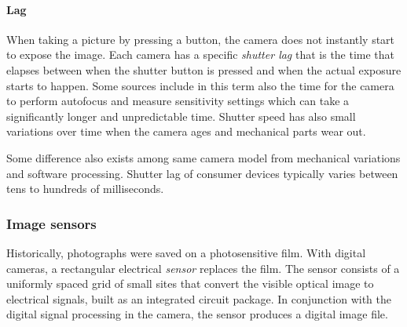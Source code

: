 

%
%


\paragraph{Lag}
When taking a picture by pressing a button, the camera does not instantly start to expose the image.
Each camera has a specific \emph{shutter lag} that is the time that elapses between when the shutter button is pressed and when the actual exposure starts to happen.
Some sources include in this term also the time for the camera to perform autofocus and measure sensitivity settings which can take a significantly longer and unpredictable time.
Shutter speed has also small variations over time when the camera ages and mechanical parts wear out.

Some difference also exists among same camera model from mechanical variations and software processing.
Shutter lag of consumer devices typically varies between tens to hundreds of milliseconds.
\cite{hasshutterlag}

\subsubsection{Image sensors} \label{sec:sensors} %


Historically, photographs were saved on a photosensitive film.
With digital cameras, a rectangular electrical \emph{sensor} replaces the film.
The sensor consists of a uniformly spaced grid of small sites that convert the visible optical image to electrical signals, built as an integrated circuit package.
In conjunction with the digital signal processing in the camera, the sensor produces a digital image file.

